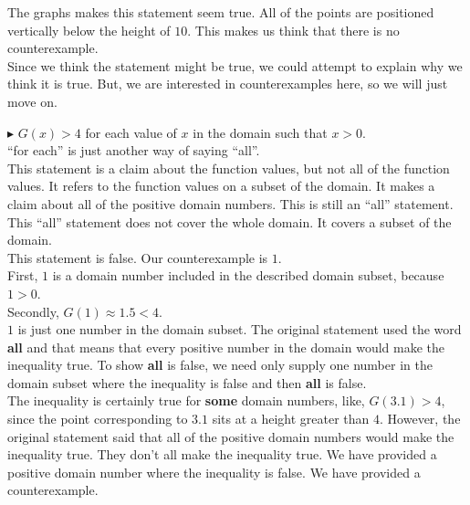 \documentclass{ximera}
\begin{document}
The graphs makes this statement seem true.  All of the points are positioned vertically below the height of $10$.  This makes us think that there is no counterexample.  \\

Since we think the statement might be true, we could attempt to explain why we think it is true.  But, we are interested in counterexamples here, so we will just move on.















\textbf{\textcolor{red!90!darkgray}{$\blacktriangleright$}} $G(x) > 4$ for each value of $x$ in the domain such that $x > 0$. \\



``for each'' is just another way of saying ``all''.\\

This statement is a claim about the function values, but not all of the function values.  It refers to the function values on a subset of the domain.  It makes a claim about all of the positive domain numbers. This is still an ``all'' statement.  This ``all'' statement does not cover the whole domain.  It covers a subset of the domain.\\



This statement is false. Our counterexample is $1$.  \\


First, $1$ is a domain number included in the described domain subset, because $1 > 0$. \\


Secondly, $G(1) \approx 1.5 < 4$. \\



$1$ is just one number in the domain subset.   The original statement used the word \textbf{all} and that means that every positive number in the domain would make the inequality true.  To show \textbf{all} is false, we need only supply one number in the domain subset where the inequality is false and then \textbf{all} is false. \\

The inequality is certainly true for \textbf{some} domain numbers, like, $G(3.1) > 4$, since the point corresponding to $3.1$ sits at a height greater than $4$.  However, the original statement said that all of the positive domain numbers would make the inequality true. They don't all make the inequality true.  We have provided a positive domain number where the inequality is false. We have provided a counterexample. \\
\end{document}
